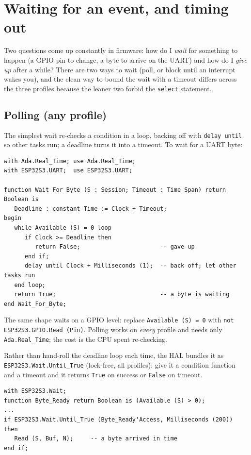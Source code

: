 \section{Waiting for an event, and timing out}
\label{sec:waiting}

Two questions come up constantly in firmware: how do I \emph{wait} for something
to happen (a GPIO pin to change, a byte to arrive on the UART) and how do I
\emph{give up} after a while? There are two ways to wait (poll, or block until an
interrupt wakes you), and the clean way to bound the wait with a timeout differs
across the three profiles because the leaner two forbid the \texttt{select}
statement.

\subsection{Polling (any profile)}

The simplest wait re-checks a condition in a loop, backing off with
\texttt{delay until} so other tasks run; a deadline turns it into a timeout. To
wait for a UART byte:

\begin{lstlisting}
with Ada.Real_Time; use Ada.Real_Time;
with ESP32S3.UART;  use ESP32S3.UART;

function Wait_For_Byte (S : Session; Timeout : Time_Span) return Boolean is
   Deadline : constant Time := Clock + Timeout;
begin
   while Available (S) = 0 loop
      if Clock >= Deadline then
         return False;                       -- gave up
      end if;
      delay until Clock + Milliseconds (1);  -- back off; let other tasks run
   end loop;
   return True;                              -- a byte is waiting
end Wait_For_Byte;
\end{lstlisting}

The same shape waits on a GPIO level: replace \texttt{Available (S) = 0} with
\texttt{not ESP32S3.GPIO.Read (Pin)}. Polling works on \emph{every} profile and
needs only \texttt{Ada.Real\_Time}; the cost is the CPU spent re-checking.

Rather than hand-roll the deadline loop each time, the HAL bundles it as
\texttt{ESP32S3.Wait.Until\_True} (lock-free, all profiles): give it a condition
function and a timeout and it returns \texttt{True} on success or \texttt{False}
on timeout.

\begin{lstlisting}
with ESP32S3.Wait;
function Byte_Ready return Boolean is (Available (S) > 0);
...
if ESP32S3.Wait.Until_True (Byte_Ready'Access, Milliseconds (200)) then
   Read (S, Buf, N);     -- a byte arrived in time
end if;
\end{lstlisting}


